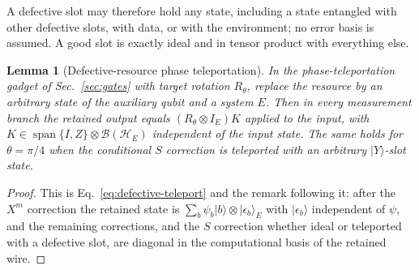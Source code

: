 \documentclass[aps,prx,reprint,superscriptaddress,nofootinbib,floatfix,longbibliography]{revtex4-2}
\newtheorem{lemma}[theorem]{Lemma}
\theoremstyle{definition}
\begin{document}
A defective slot may therefore hold any state, including a state entangled
with other defective slots, with data, or with the environment; no error basis
is assumed.  A good slot is exactly ideal and in tensor product with
everything else.

\begin{lemma}[Defective-resource phase teleportation]
\label{lem:defective-teleport}
In the phase-teleportation gadget of Sec.~\ref{sec:gates} with target
rotation $R_\theta$, replace the resource by an arbitrary state of the
auxiliary qubit and a system $E$.  Then in every measurement branch the
retained output equals $(R_\theta\otimes I_E)K$ applied to the input, with
$K\in\operatorname{span}\{I,Z\}\otimes\mathcal B(\mathcal H_E)$ independent of
the input state.  The same holds for $\theta=\pi/4$ when the conditional $S$
correction is teleported with an arbitrary $|Y\rangle$-slot state.
\end{lemma}
\begin{proof}
This is Eq.~\eqref{eq:defective-teleport} and the remark following it: after
the $X^m$ correction the retained state is
$\sum_b\psi_b|b\rangle\otimes|\epsilon_b\rangle_E$ with $|\epsilon_b\rangle$
independent of $\psi$, and the remaining corrections, and the $S$ correction
whether ideal or teleported with a defective slot, are diagonal in the
computational basis of the retained wire.
\end{proof}
\end{document}
